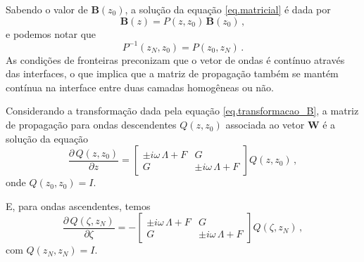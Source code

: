 Sabendo o valor de $\mathbf{B}(z_0)$, a solu\c{c}\~ao da equa\c{c}\~ao \ref{eq.matricial} \'e dada por
\begin{equation*}
\mathbf{B}(z)=P(z,z_0)\,\mathbf{B}(z_0)\,,
\end{equation*}
e podemos notar que 
\begin{equation*}
P^{-1}(z_N,z_0)=P(z_0,z_N)\,.
\end{equation*}
As condi\c{c}\~oes de fronteiras preconizam que o vetor de ondas \'e cont\'inuo atrav\'es das interfaces, o que implica que a matriz de propaga\c{c}\~ao tamb\'em se mant\'em cont\'inua na interface entre duas camadas homog\^eneas ou n\~ao.

Considerando a transforma\c{c}\~ao dada pela equa\c{c}\~ao \ref{eq.transformacao_B}, a matriz de propaga\c{c}\~ao para ondas descendentes $Q(z,z_0)$ associada ao vetor $\mathbf{W}$ \'e a solu\c{c}\~ao da equa\c{c}\~ao
\begin{equation}\label{eq.Q_nao_homogenea}
\frac{\partial\,Q(z,z_0)}{\partial z}=
\begin{bmatrix}
\pm i\omega\,\Lambda+F&G\\
G&\pm i\omega\,\Lambda+F
\end{bmatrix}
Q(z,z_0)\,,
\end{equation}
onde $Q(z_0,z_0)=I$.

E, para ondas ascendentes, temos
\begin{equation*}
\frac{\partial\,Q(\zeta,z_N)}{\partial \zeta}=-
\begin{bmatrix}
\pm i\omega\,\Lambda+F&G\\
G&\pm i\omega\,\Lambda+F
\end{bmatrix}
Q(\zeta,z_N)\,,
\end{equation*}
com $Q(z_N,z_N)=I$.

